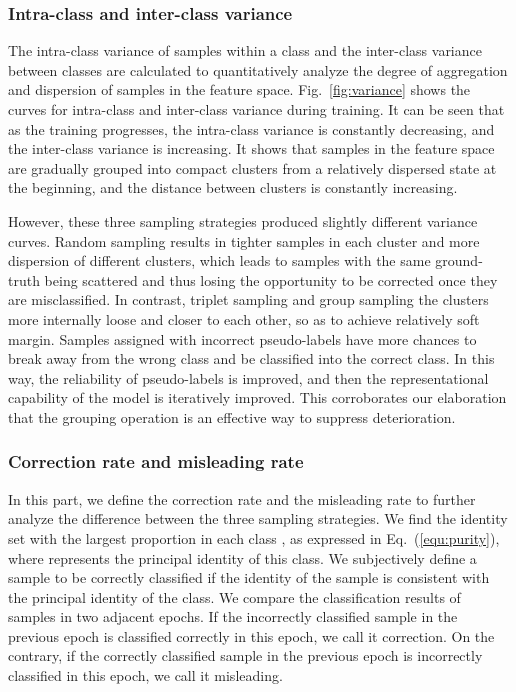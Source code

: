 \documentclass[lettersize,journal]{IEEEtran}
\begin{document}
\subsubsection{Intra-class and inter-class variance}
The intra-class variance of samples within a class and the inter-class variance between classes are calculated to quantitatively analyze the degree of aggregation and dispersion of samples in the feature space. Fig.~\ref{fig:variance} shows the curves for intra-class and inter-class variance during training. It can be seen that as the training progresses, the intra-class variance is constantly decreasing, and the inter-class variance is increasing. It shows that samples in the feature space are gradually grouped into compact clusters from a relatively dispersed state at the beginning, and the distance between clusters is constantly increasing.

However, these three sampling strategies produced slightly different variance curves. Random sampling results in tighter samples in each cluster and more dispersion of different clusters, which leads to samples with the same ground-truth being scattered and thus losing the opportunity to be corrected once they are misclassified. In contrast, triplet sampling and group sampling the clusters more internally loose and closer to each other, so as to achieve relatively soft margin. Samples assigned with incorrect pseudo-labels have more chances to break away from the wrong class and be classified into the correct class. In this way, the reliability of pseudo-labels is improved, and then the representational capability of the model is iteratively improved. This corroborates our elaboration that the grouping operation is an effective way to suppress deterioration.

\subsubsection{Correction rate and misleading rate}
In this part, we define the correction rate and the misleading rate to further analyze the difference between the three sampling strategies. We find the identity set  with the largest proportion in each class , as expressed in Eq.~(\ref{equ:purity}), where  represents the principal identity of this class. We subjectively define a sample to be correctly classified if the identity  of the sample is consistent with the principal identity  of the class.
We compare the classification results of samples in two adjacent epochs. If the incorrectly classified sample in the previous epoch is classified correctly in this epoch, we call it correction. On the contrary, if the correctly classified sample in the previous epoch is incorrectly classified in this epoch, we call it misleading. 
\end{document}

